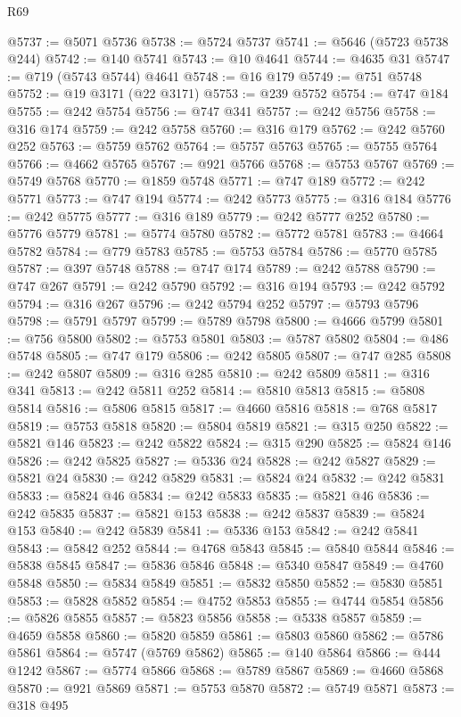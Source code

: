 \begin{lexlean}{R69}
\begin{coremodule}
{@5737 := @5071 @5736
@5738 := @5724 @5737
@5741 := @5646 (@5723 @5738 @244)
@5742 := @140 @5741
@5743 := @10 @4641
@5744 := @4635 @31
@5747 := @719 (@5743 @5744) @4641
@5748 := @16 @179
@5749 := @751 @5748
@5752 := @19 @3171 (@22 @3171)
@5753 := @239 @5752
@5754 := @747 @184
@5755 := @242 @5754
@5756 := @747 @341
@5757 := @242 @5756
@5758 := @316 @174
@5759 := @242 @5758
@5760 := @316 @179
@5762 := @242 @5760 @252
@5763 := @5759 @5762
@5764 := @5757 @5763
@5765 := @5755 @5764
@5766 := @4662 @5765
@5767 := @921 @5766
@5768 := @5753 @5767
@5769 := @5749 @5768
@5770 := @1859 @5748
@5771 := @747 @189
@5772 := @242 @5771
@5773 := @747 @194
@5774 := @242 @5773
@5775 := @316 @184
@5776 := @242 @5775
@5777 := @316 @189
@5779 := @242 @5777 @252
@5780 := @5776 @5779
@5781 := @5774 @5780
@5782 := @5772 @5781
@5783 := @4664 @5782
@5784 := @779 @5783
@5785 := @5753 @5784
@5786 := @5770 @5785
@5787 := @397 @5748
@5788 := @747 @174
@5789 := @242 @5788
@5790 := @747 @267
@5791 := @242 @5790
@5792 := @316 @194
@5793 := @242 @5792
@5794 := @316 @267
@5796 := @242 @5794 @252
@5797 := @5793 @5796
@5798 := @5791 @5797
@5799 := @5789 @5798
@5800 := @4666 @5799
@5801 := @756 @5800
@5802 := @5753 @5801
@5803 := @5787 @5802
@5804 := @486 @5748
@5805 := @747 @179
@5806 := @242 @5805
@5807 := @747 @285
@5808 := @242 @5807
@5809 := @316 @285
@5810 := @242 @5809
@5811 := @316 @341
@5813 := @242 @5811 @252
@5814 := @5810 @5813
@5815 := @5808 @5814
@5816 := @5806 @5815
@5817 := @4660 @5816
@5818 := @768 @5817
@5819 := @5753 @5818
@5820 := @5804 @5819
@5821 := @315 @250
@5822 := @5821 @146
@5823 := @242 @5822
@5824 := @315 @290
@5825 := @5824 @146
@5826 := @242 @5825
@5827 := @5336 @24
@5828 := @242 @5827
@5829 := @5821 @24
@5830 := @242 @5829
@5831 := @5824 @24
@5832 := @242 @5831
@5833 := @5824 @46
@5834 := @242 @5833
@5835 := @5821 @46
@5836 := @242 @5835
@5837 := @5821 @153
@5838 := @242 @5837
@5839 := @5824 @153
@5840 := @242 @5839
@5841 := @5336 @153
@5842 := @242 @5841
@5843 := @5842 @252
@5844 := @4768 @5843
@5845 := @5840 @5844
@5846 := @5838 @5845
@5847 := @5836 @5846
@5848 := @5340 @5847
@5849 := @4760 @5848
@5850 := @5834 @5849
@5851 := @5832 @5850
@5852 := @5830 @5851
@5853 := @5828 @5852
@5854 := @4752 @5853
@5855 := @4744 @5854
@5856 := @5826 @5855
@5857 := @5823 @5856
@5858 := @5338 @5857
@5859 := @4659 @5858
@5860 := @5820 @5859
@5861 := @5803 @5860
@5862 := @5786 @5861
@5864 := @5747 (@5769 @5862)
@5865 := @140 @5864
@5866 := @444 @1242
@5867 := @5774 @5866
@5868 := @5789 @5867
@5869 := @4660 @5868
@5870 := @921 @5869
@5871 := @5753 @5870
@5872 := @5749 @5871
@5873 := @318 @495
}
\end{coremodule}
\end{lexlean}
